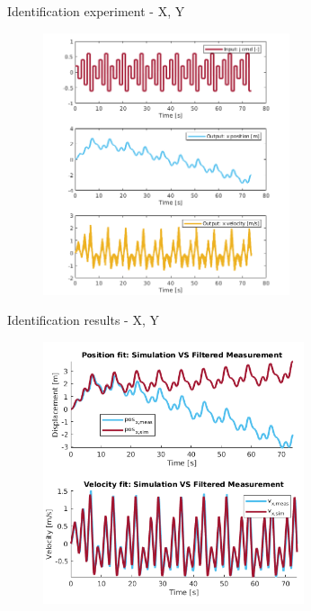 \begin{frame}{Identification experiment - X, Y}

\begin{figure}[h]
    \vspace{-3.4mm}
    \centering
    \includegraphics[height=7.7cm]{Figures/X_pos_vel_input_output.png}
    \label{fig:coord_frame}
    \end{figure}
    
\end{frame}

\begin{frame}{Identification results - X, Y}

\begin{figure}[h]
    \centering
    \includegraphics[height=7.7cm]{Figures/X_pos_vel_fit_result.png}
    \label{fig:coord_frame}
    \end{figure}
    
\end{frame}